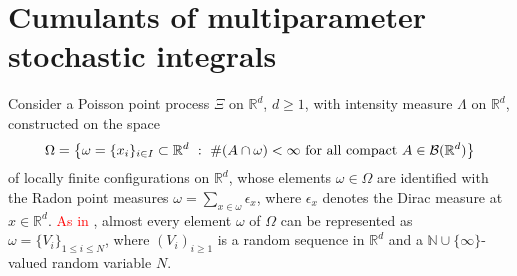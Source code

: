 \documentclass[12pt]{article}
\newcommand{\R}{\mathbb{R}}
\newcommand{\N}{\mathbb{N}}
\def\real{{\mathord{\mathbb R}}}
\def\N{{\mathord{\mathbb N}}}
\numberwithin{equation}{section}
\begin{document}
\section{Cumulants of multiparameter stochastic integrals} 
\label{s4}
\noindent 
 Consider a Poisson point process $\Xi$ on $\R^d$, $d \geq 1$, with intensity
measure $\Lambda$ on $\real^d$, %
 constructed on the space $$
 \Omega = \big\{
 \omega = \{ x_i \}_{i\in I} \subset \R^d \ : \
 \#( A \cap \omega ) < \infty 
 \mbox{ for all compact } A\in {\cal B} (\R^d) 
 \big\}
 $$
 of locally finite configurations on $\R^d$, whose elements 
 $\omega \in \Omega$ are identified with the Radon point measures 
 $\displaystyle \omega = \sum_{x\in \omega} \epsilon_x$, 
 where $\epsilon_x$ denotes the Dirac measure at $x\in \R^d$. 
 \textcolor{red}{As in} \cite[Corollary~6.5]{LastPenrose17}, almost every
 element $ \omega$ of $\Omega$ 
 can be represented as $\omega =\{V_i\}_{1\leq i\leq N}$,
 where $(V_i)_{i\geq 1}$ is a random sequence 
 in $\R^d$ and a $\N\cup\{\infty\}$-valued random variable $N$.

 \medskip
\end{document}
